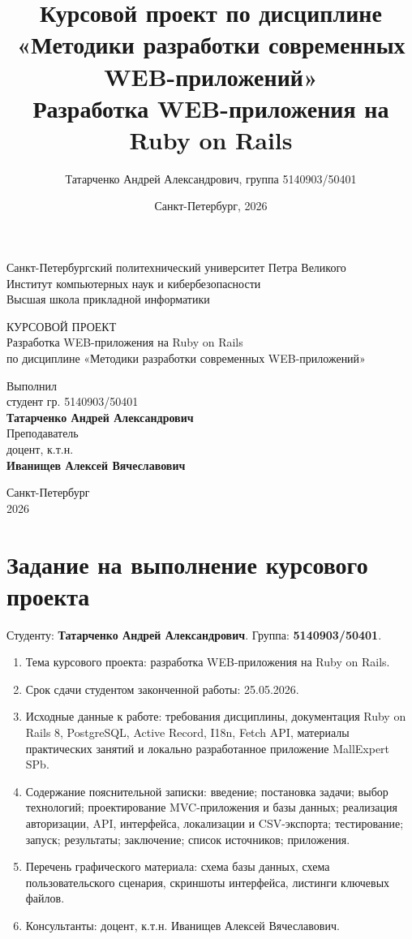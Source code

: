 \documentclass[14pt,a4paper]{extarticle}
\title{Курсовой проект по дисциплине «Методики разработки современных WEB-приложений»\\
\large Разработка WEB-приложения на Ruby on Rails}
\author{Татарченко Андрей Александрович, группа 5140903/50401}
\date{Санкт-Петербург, 2026}
\begin{document}
\begin{titlepage}
\begin{center}
Санкт-Петербургский политехнический университет Петра Великого\\
Институт компьютерных наук и кибербезопасности\\
Высшая школа прикладной информатики

\vfill

{\Large КУРСОВОЙ ПРОЕКТ}\\[1.2cm]
{\Large Разработка WEB-приложения на Ruby on Rails}\\[0.4cm]
по дисциплине «Методики разработки современных WEB-приложений»

\vfill

\begin{flushright}
Выполнил\\
студент гр. 5140903/50401\\
\textbf{Татарченко Андрей Александрович}\\[0.7cm]
Преподаватель\\
доцент, к.т.н.\\
\textbf{Иванищев Алексей Вячеславович}
\end{flushright}

\vfill

Санкт-Петербург\\
2026
\end{center}
\end{titlepage}

\newpage
\section*{Задание на выполнение курсового проекта}

Студенту: \textbf{Татарченко Андрей Александрович}. Группа: \textbf{5140903/50401}.

\begin{enumerate}
  \item Тема курсового проекта: разработка WEB-приложения на Ruby on Rails.
  \item Срок сдачи студентом законченной работы: 25.05.2026.
  \item Исходные данные к работе: требования дисциплины, документация Ruby on Rails 8, PostgreSQL, Active Record, I18n, Fetch API, материалы практических занятий и локально разработанное приложение MallExpert SPb.
  \item Содержание пояснительной записки: введение; постановка задачи; выбор технологий; проектирование MVC-приложения и базы данных; реализация авторизации, API, интерфейса, локализации и CSV-экспорта; тестирование; запуск; результаты; заключение; список источников; приложения.
  \item Перечень графического материала: схема базы данных, схема пользовательского сценария, скриншоты интерфейса, листинги ключевых файлов.
  \item Консультанты: доцент, к.т.н. Иванищев Алексей Вячеславович.
\end{enumerate}
\end{document}
